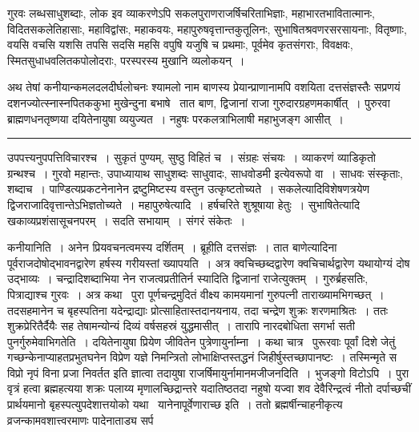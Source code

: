 \documentclass[11pt, openany]{book}
\begin{document}
\newpage

\noindent
गुरवः लब्धसाधुशब्दाः, लोक इव व्याकरणेऽपि सकलपुराणराजर्षिचरिताभिज्ञाः, महाभारतभावितात्मानः, विदितसकलेतिहासाः, महाविद्वांसः, महाकवयः, महापुरुषवृत्तान्तकुतूलिनः, सुभाषितश्रवणरसरसायनाः, वितृष्णाः, वयसि वचसि यशसि तपसि सदसि महसि वपुषि यजुषि च प्रथमाः, पूर्वमेव कृतसंगराः, विवक्षवः, स्मितसुधाधवलितकपोलोदराः, परस्परस्य मुखानि व्यलोकयन्~।

अथ तेषां कनीयान्कमलदलदीर्घलोचनः श्यामलो नाम बाणस्य प्रेयान्प्राणानामपि वशयिता दत्तसंज्ञस्तैः सप्रणयं दशनज्योत्स्नास्नपितककुभा मुखेन्दुना बभाषे \textendash\ तात बाण, द्विजानां राजा गुरुदारग्रहणमकार्षीत्~। पुरुरवा ब्राह्मणधनतृष्णया दयितेनायुषा व्ययुज्यत~। नहुषः परकलत्राभिलाषी महाभुजङ्ग आसीत्~।

\vspace{2mm}
\hrule

\noindent
{\s उपपत्त्यनुपपत्तिविचारश्च~। सुकृतं पुण्यम्, सुष्ठु विहितं च~। संग्रहः संचयः~। व्याकरणं व्याडिकृतो ग्रन्थश्च~। गुरवो महान्तः, उपाध्यायाथ साधुशब्दः साधुवादः, साधवोडमी इत्येवरूपो वा~। साधवः संस्कृताः, शब्दाच~। पाण्डित्यप्रकटनेनानेन द्रष्टुमिष्टस्य वस्तुन उत्कृष्टतोच्यते~। सकलेत्यादिविशेषणत्रयेण द्विजराजादिवृत्तान्तेऽभिज्ञतोच्यते~। {\qtt महापुरुषेत्यादि}~। हर्षचरिते शुश्रूषाया हेतुः~। {\qtt सुभाषितेत्यादि} खकाव्यप्रशंसासूचनपरम्~। सदति सभायाम्~। संगरं संकेतः~।

{\qtt कनीयानिति}~। अनेन प्रियवचनत्वमस्य दर्शितम्~। ब्रूहीति दत्तसंज्ञः~। तात बाणेत्यादिना पूर्वराजदोषोद्भावनद्वारेण हर्षस्य गरीयस्तां ख्यापयति~। अत्र क्वचिच्छब्दद्वारेण क्वचिचार्थद्वारेण यथायोग्यं दोष उद्भाव्यः~। चन्द्रादिशब्दाभिया नेन राजत्वप्रतीतिर्न स्यादिति द्विजानां राजेत्युक्तम्~। गुरुर्ब्रहसतिः, पित्राद्याश्च गुरवः~। अत्र कथा \textendash\ पुरा पूर्णचन्द्रमुदितं वीक्ष्य कामयमानां गुरुपत्नी ताराख्यामभिगच्छत्~। तदसहमानेन च बृहस्पतिना यदेन्द्राद्याः प्रोत्साहितास्तदानयनाय, तदा चन्द्रेण शुक्रः शरणमाश्रितः~। ततः शुक्रप्रेरितैर्दैयैः सह तेषामन्योन्यं दिव्यं वर्षसहस्रं युद्धमासीत्~। तारापि नारदबोधिता सगर्भा सती पुनर्गुरुमेवाभिगतेति~। दयितेनायुषा प्रियेण जीवितेन पुत्रेणायुर्नाम्ना~। कथा चात्र \textendash\ पुरूरवाः पूर्वां दिशे जेतुं गच्छन्केनाप्याहतप्रभुतघनेन विप्रेण यज्ञे निमन्त्रितो लोभाक्षिप्तस्तद्धनं जिहीर्षुस्तच्छापानष्टः~। तस्मिन्मृते स विप्रो नृपं विना प्रजा निवर्तत इति ज्ञात्वा तदायुषा राजर्षिमायुर्नामानमजीजनदिति~। भुजङ्गो विटोऽपि~। पुरा वृत्रं हत्वा ब्रह्महत्यया शक्रः पलाय्य मृणालच्छिद्रान्तरे यदातिष्ठतदा नहुषो यज्वा शव देवैरिन्द्रत्वं नीतो दर्पाच्छचीं प्रार्थयमानो बृहस्पत्युपदेशात्तयोको यथा \textendash\ {\qt यानेनापूर्वेणाराच्छ} इति~। ततो ब्रह्मर्षीन्चाहनीकृत्य व्रजन्कामवशात्त्वरमाणः पादेनाताड्य सर्प}
\end{document}
